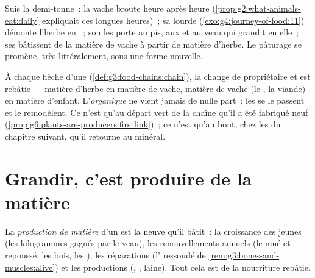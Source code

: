 \begin{example}\label{ex:g6:matter-from-food:cow}
Suis la demi-tonne~: la vache broute heure après heure
(\cref{prop:g2:what-animals-eat:daily} expliquait ces longues
heures)~; sa lourde 
(\cref{exo:g4:journey-of-food:11}) démonte l'herbe en ~;
son  les porte au pis, aux  et au veau qui grandit en
elle~; ses  bâtissent de la matière de vache à partir de
matière d'herbe. Le pâturage se promène, très littéralement, sous
une forme nouvelle.
\end{example}

\begin{remark}\label{rem:g6:matter-from-food:hands}
À chaque flèche d'une 
(\cref{def:g3:food-chains:chain}), la  change de
propriétaire et est rebâtie --- matière d'herbe en matière de vache,
matière de vache (le , la viande) en matière d'enfant.
L'\emph{organique} ne vient jamais de nulle part~: les 
se le passent et le remodèlent. Ce n'est qu'au départ vert de la
chaîne qu'il a été fabriqué neuf
(\cref{prop:g6:plants-are-producers:firstlink})~; ce n'est qu'au
bout, chez les  du chapitre suivant, qu'il retourne au
minéral.
\end{remark}

\section{Grandir, c'est produire de la matière}

\begin{definition}\label{def:g6:matter-from-food:production}
La \emph{production de matière} d'un
 est la  neuve qu'il bâtit~: la croissance
des jeunes (les kilogrammes gagnés par le veau), les renouvellements
annuels (le  mué et repoussé, les bois, les ), les
réparations (l' ressoudé de
\cref{rem:g3:bones-and-muscles:alive}) et les productions (,
, laine). Tout cela est de la nourriture rebâtie.
\end{definition}

